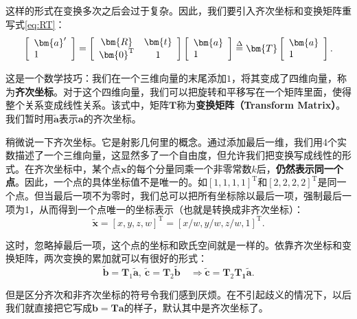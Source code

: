 这样的形式在变换多次之后会过于复杂。因此，我们要引入齐次坐标和变换矩阵重写式\eqref{eq:RT}：
\begin{equation}
\left[ \begin{array}{l}
\bm{a}'\\
1
\end{array} \right] = 
\left[ {\begin{array}{*{20}{c}}
	\bm{R}&\bm{t}\\
	{{\bm{0}^\mathrm{T}}}&1
	\end{array}} \right]
\left[ \begin{array}{l}
\bm{a}\\
1
\end{array} \right]  \buildrel \Delta \over = \bm{T} \left[ \begin{array}{l}
\bm{a}\\
1
\end{array} \right].
\end{equation}

这是一个数学技巧：我们在一个三维向量的末尾添加$1$，将其变成了四维向量，称为\textbf{齐次坐标}。对于这个四维向量，我们可以把旋转和平移写在一个矩阵里面，使得整个关系变成线性关系。该式中，矩阵$\bm{T}$称为\textbf{变换矩阵（Transform Matrix）}。我们暂时用$ \tilde{ \bm{a} }$表示$\bm{a}$的齐次坐标。

稍微说一下齐次坐标。它是射影几何里的概念。通过添加最后一维，我们用4个实数描述了一个三维向量，这显然多了一个自由度，但允许我们把变换写成线性的形式。在齐次坐标中，某个点$\bm{x}$的每个分量同乘一个非零常数$k$后，\textbf{仍然表示同一个点}。因此，一个点的具体坐标值不是唯一的。如$\left[1,1,1,1\right]^\mathrm{T}$和$\left[2,2,2,2\right]^\mathrm{T}$是同一个点。但当最后一项不为零时，我们总可以把所有坐标除以最后一项，强制最后一项为1，从而得到一个点唯一的坐标表示（也就是转换成非齐次坐标）：
\begin{equation}
\tilde{\bm{x}} = \left[ x, y, z,w \right]^\mathrm{T} = \left[ x/w, y/w, z/w, 1 \right]^\mathrm{T} .
\end{equation}

这时，忽略掉最后一项，这个点的坐标和欧氏空间就是一样的。依靠齐次坐标和变换矩阵，两次变换的累加就可以有很好的形式：
\begin{equation}
	\tilde{\bm{b}} = \bm{T}_1 \tilde{\bm{a}}, \  \tilde{\bm{c}} = \bm{T}_2 \tilde{\bm{b}} \quad \Rightarrow \tilde{\bm{c}} = \bm{T}_2 \bm{T_1} \tilde{\bm{a}}.
\end{equation}

但是区分齐次和非齐次坐标的符号令我们感到厌烦。在不引起歧义的情况下，以后我们就直接把它写成$\bm{b}= \bm{T} \bm{a}$的样子，默认其中是齐次坐标了。

